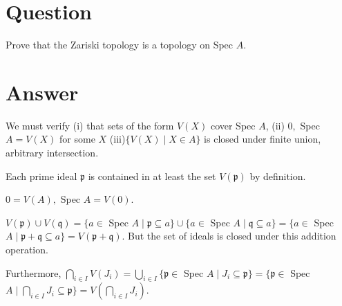 \documentclass[11pt]{article}
\begin{document}
\section*{Question}
Prove that the Zariski topology is a topology on Spec $A$.
\section*{Answer}
We must verify (i) that sets of the form $V(X)$ cover Spec $A$, (ii) $0, $ Spec $A = V(X)$ for some $X$ (iii)$\{V(X) \mid X \in A\}$ is closed under finite union,  arbitrary intersection. 

Each prime ideal $\mathfrak{p}$ is contained in at least the set $V(\mathfrak{p})$ by definition.

$0 = V(A) , $ Spec $A = V( 0).$

$V(\mathfrak{p} ) \cup V(\mathfrak{q}) = \{ a \in $ Spec $A \mid \mathfrak{p} \subseteq a\} \cup  \{ a \in $ Spec $A \mid \mathfrak{q} \subseteq a\} =  \{ a \in $ Spec $A \mid \mathfrak{p} + \mathfrak{q} \subseteq a\} = V(\mathfrak{p} + \mathfrak{q})$. But the set of ideals is closed under this addition operation.

Furthermore, $\bigcap_{i \in I}V(J_i) = \bigcup_{i \in I} \{ \mathfrak{p} \in $ Spec $A \mid J_i \subseteq \mathfrak{p}\}  =  \{ \mathfrak{p} \in $ Spec $A \mid \bigcap_{i \in I} J_i \subseteq \mathfrak{p} \}  = V(\bigcap_{i \in I} J_i)$.
\end{document}
